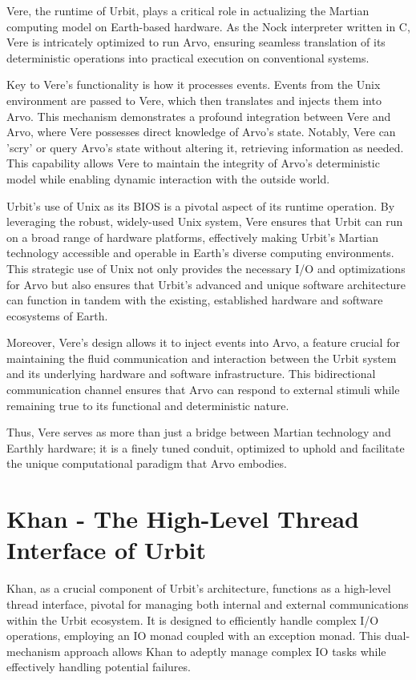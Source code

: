 \documentclass[twoside]{article}
\begin{document}
Vere, the runtime of Urbit, plays a critical role in actualizing the Martian computing model on Earth-based hardware. As the Nock interpreter written in C, Vere is intricately optimized to run Arvo, ensuring seamless translation of its deterministic operations into practical execution on conventional systems.

Key to Vere's functionality is how it processes events. Events from the Unix environment are passed to Vere, which then translates and injects them into Arvo. This mechanism demonstrates a profound integration between Vere and Arvo, where Vere possesses direct knowledge of Arvo's state. Notably, Vere can 'scry' or query Arvo's state without altering it, retrieving information as needed. This capability allows Vere to maintain the integrity of Arvo's deterministic model while enabling dynamic interaction with the outside world.

Urbit's use of Unix as its BIOS is a pivotal aspect of its runtime operation. By leveraging the robust, widely-used Unix system, Vere ensures that Urbit can run on a broad range of hardware platforms, effectively making Urbit's Martian technology accessible and operable in Earth's diverse computing environments. This strategic use of Unix not only provides the necessary I/O and optimizations for Arvo but also ensures that Urbit's advanced and unique software architecture can function in tandem with the existing, established hardware and software ecosystems of Earth.

Moreover, Vere's design allows it to inject events into Arvo, a feature crucial for maintaining the fluid communication and interaction between the Urbit system and its underlying hardware and software infrastructure. This bidirectional communication channel ensures that Arvo can respond to external stimuli while remaining true to its functional and deterministic nature. 

Thus, Vere serves as more than just a bridge between Martian technology and Earthly hardware; it is a finely tuned conduit, optimized to uphold and facilitate the unique computational paradigm that Arvo embodies.


\section{Khan - The High-Level Thread Interface of Urbit}

Khan, as a crucial component of Urbit's architecture, functions as a high-level thread interface, pivotal for managing both internal and external communications within the Urbit ecosystem. It is designed to efficiently handle complex I/O operations, employing an IO monad coupled with an exception monad. This dual-mechanism approach allows Khan to adeptly manage complex IO tasks while effectively handling potential failures.
\end{document}
